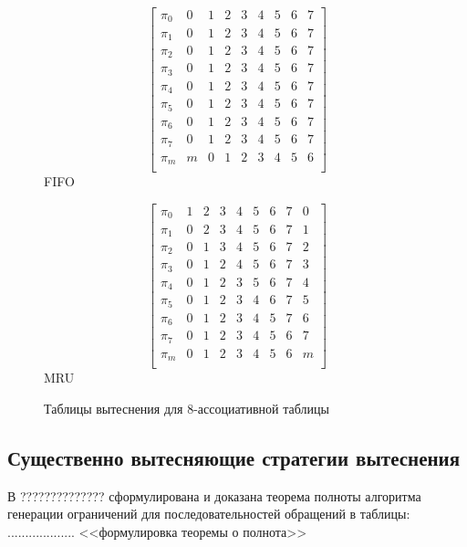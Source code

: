 \documentclass[14pt]{extreport}
\newcommand{\FIFO}{\textsf{FIFO}\xspace}
\newcommand{\MRU}{\textsf{MRU}\xspace}
\begin{document}
\begin{figure}[h] \centering
\parbox{0.4\textwidth}{
$$ \left[
     \begin{array}{c|cccccccc}
       \pi_0 & 0 & 1 & 2 & 3 & 4 & 5 & 6 & 7 \\
       \pi_1 & 0 & 1 & 2 & 3 & 4 & 5 & 6 & 7 \\
       \pi_2 & 0 & 1 & 2 & 3 & 4 & 5 & 6 & 7 \\
       \pi_3 & 0 & 1 & 2 & 3 & 4 & 5 & 6 & 7 \\
       \pi_4 & 0 & 1 & 2 & 3 & 4 & 5 & 6 & 7 \\
       \pi_5 & 0 & 1 & 2 & 3 & 4 & 5 & 6 & 7 \\
       \pi_6 & 0 & 1 & 2 & 3 & 4 & 5 & 6 & 7 \\
       \pi_7 & 0 & 1 & 2 & 3 & 4 & 5 & 6 & 7 \\
       \pi_m & m & 0 & 1 & 2 & 3 & 4 & 5 & 6 \\
     \end{array}
   \right]$$
\center \FIFO} \qquad
\parbox{0.4\textwidth}{
$$ \left[
     \begin{array}{c|cccccccc}
       \pi_0 & 1 & 2 & 3 & 4 & 5 & 6 & 7 & 0 \\
       \pi_1 & 0 & 2 & 3 & 4 & 5 & 6 & 7 & 1 \\
       \pi_2 & 0 & 1 & 3 & 4 & 5 & 6 & 7 & 2 \\
       \pi_3 & 0 & 1 & 2 & 4 & 5 & 6 & 7 & 3 \\
       \pi_4 & 0 & 1 & 2 & 3 & 5 & 6 & 7 & 4 \\
       \pi_5 & 0 & 1 & 2 & 3 & 4 & 6 & 7 & 5 \\
       \pi_6 & 0 & 1 & 2 & 3 & 4 & 5 & 7 & 6 \\
       \pi_7 & 0 & 1 & 2 & 3 & 4 & 5 & 6 & 7 \\
       \pi_m & 0 & 1 & 2 & 3 & 4 & 5 & 6 & m \\
     \end{array}
   \right]$$
\center \MRU } \caption{Таблицы вытеснения для 8-ассоциативной таблицы}\label{fig:fifo_mru_tables}
\end{figure}

\subsection{Существенно вытесняющие стратегии вытеснения}\label{sec:essentially_displacing}

В ?????????????? сформулирована и доказана теорема полноты алгоритма генерации ограничений для последовательностей обращений в таблицы: ................... <<формулировка теоремы о полнота>>
\end{document}
